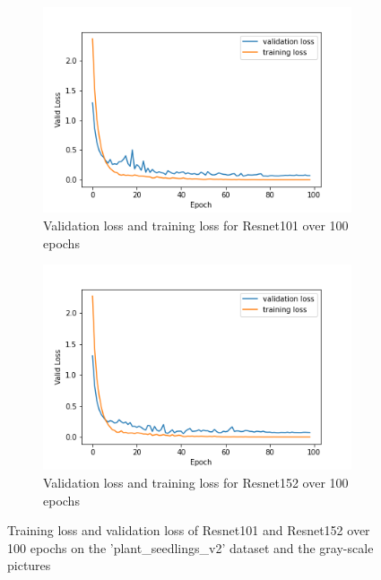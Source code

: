      
\begin{figure}[h]
\begin{subfigure}{0.5\textwidth}
     \centering
	    \includegraphics[width = \gws cm]{epoch_valid_loss_resnet101_2.png}
\caption{Validation loss and training loss for Resnet101 over 100 epochs}\label{fig:epoch_valid_loss_resnet101_2}
     \end{subfigure}
\begin{subfigure}{0.5\textwidth}
     \centering
	    \includegraphics[width = \gws cm]{epoch_valid_loss_resnet152_2.png}
\caption{Validation loss and training loss for Resnet152 over 100 epochs}\label{fig:epoch_valid_loss_resnet152_2}
     \end{subfigure}  
     \caption{Training loss and validation loss of Resnet101 and Resnet152 over 100 epochs on the  'plant\_seedlings\_v2' dataset and the gray-scale pictures}
        \label{fig:tran_valid_loss_seeds_res_100_2}
\end{figure}



